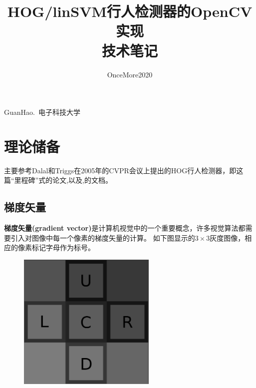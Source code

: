 \documentclass[10pt,technote,onecolumn,twoside]{IEEEtran}
\begin{document}
\title{HOG/linSVM行人检测器的OpenCV实现\\技术笔记}
\author{OnceMore2020}

%
{GuanHao.~电子科技大学}


\maketitle
\IEEEdisplaynontitleabstractindextext

\section{理论储备}
主要参考Dalal和Triggs在2005年的CVPR会议上提出的HOG行人检测器，即\cite{bib1}这篇“里程碑”式的论文,以及\cite{bib3},\cite{bib4}的文档。

\subsection{梯度矢量}
\textbf{梯度矢量(gradient vector)}是计算机视觉中的一个重要概念，许多视觉算法都需要引入对图像中每一个像素的梯度矢量的计算。
如下图显示的$3\times3$灰度图像，相应的像素标记字母作为标号。
\begin{figure}[htbp]
\centering
\includegraphics[width=2.6in]{gradient-3.png}
\end{figure}
\end{document}
